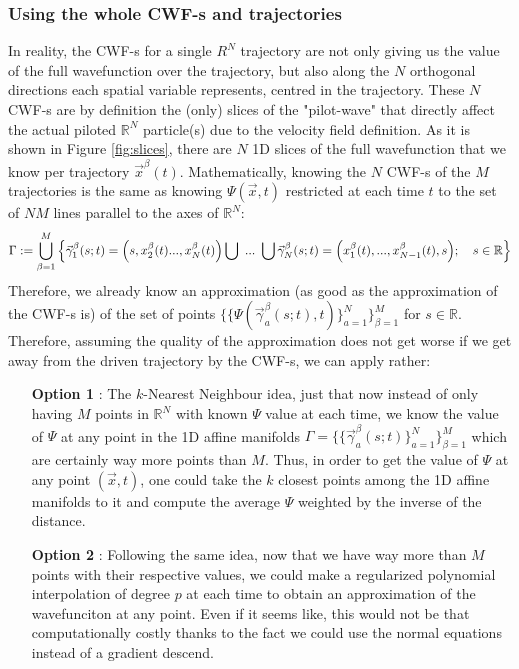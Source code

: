 \documentclass[11pt, a4paper]{article} %
\newcommand{\R}{\mathbb{R}} %
\begin{document}
\subsubsection{Using the whole CWF-s and trajectories}
In reality, the CWF-s for a single $R^N$ trajectory are not only giving us the value of the full wavefunction over the trajectory, but also along the $N$ orthogonal directions each spatial variable represents, centred in the trajectory. These $N$ CWF-s are by definition the (only) slices of the "pilot-wave" that directly affect the actual piloted $\R^N$ particle(s) due to the velocity field definition. As it is shown in Figure \ref{fig:slices}, there are $N$ 1D slices of the full wavefunction that we know per trajectory $\vec{x}^\beta (t)$. Mathematically, knowing the $N$ CWF-s of the $M$ trajectories is the same as knowing $\Psi(\vec{x},t)$ restricted at each time $t$ to the set of $NM$ lines parallel to the axes of $\R^N$:
$$
\Gamma:=\bigcup_{\beta=1}^M\qty{\vec{\gamma}_1^\beta(s;t)=\qty(s, x_2^\beta(t) ...,x_N^\beta (t))\bigcup\  ...\ \bigcup\vec{\gamma}_N^\beta(s;t)=\qty(x_1^\beta (t),...,x_{N-1}^\beta (t), s);\quad s\in \R}
$$
Therefore, we already know an approximation (as good as the approximation of the CWF-s is) of the set of points $\{\{\Psi(\vec{\gamma}^\beta_a(s;t),t)\}_{a=1}^N\}_{\beta=1}^M$ for $s\in \R$. Therefore, assuming the quality of the approximation does not get worse if we get away from the driven trajectory by the CWF-s, we can apply rather:
\begin{enumerate}
\item[\bf Option 1]: The $k$-Nearest Neighbour idea, just that now instead of only having $M$ points in $\R^N$ with known $\Psi$ value at each time, we know the value of $\Psi$ at any point in the 1D affine manifolds $\Gamma=\{\{\vec{\gamma}^\beta_a(s;t)\}_{a=1}^N\}_{\beta=1}^M$ which are certainly way more points than $M$. Thus, in order to get the value of $\Psi$ at any point $(\vec{x},t)$, one could take the $k$ closest points among the 1D affine manifolds to it and compute the average $\Psi$ weighted by the inverse of the distance.
\item[\bf Option 2]: Following the same idea, now that we have way more than $M$ points with their respective values, we could make a regularized polynomial interpolation of degree $p$ at each time to obtain an approximation of the wavefunciton at any point. Even if it seems like, this would not be that computationally costly thanks to the fact we could use the normal equations instead of a gradient descend.
\end{enumerate}
\end{document}
